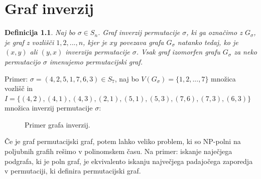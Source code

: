\documentclass[a4paper, 12pt]{book}
\newtheorem{definicija}{Definicija}[chapter]
\begin{document}
\chapter{ Graf inverzij }

\begin{definicija}
    Naj bo $\sigma \in S_n$. Graf inverzij permutacije $\sigma$, ki ga označimo z $G_{\sigma}$,  je graf z vozlišči $1, 2,..., n$, kjer je $xy$ povezava grafa $G_{\sigma}$ natanko tedaj, ko je $(x, y)$ ali $(y, x)$ inverzija permutacije $\sigma$. Vsak graf izomorfen grafu $G_{\sigma}$ za neko permutacijo $\sigma$ imenujemo permutacijski graf.
\end{definicija}

Primer: 
$\sigma = (4, 2, 5, 1, 7, 6, 3) \in S_7$, naj bo $V(G_{\sigma}) = \{ 1, 2, ..., 7\}$ množica vozlišč in $I = \{ (4, 2), (4, 1), (4, 3), (2, 1), (5, 1), (5, 3), (7, 6), (7, 3), (6, 3) \}$ množica inverzij permutacije $\sigma$:

\begin{figure}[h]
    \begin{center}        
    \end{center}
    \caption{Primer grafa inverzij.}
    \label{graf_inverzij}
\end{figure}

Če je graf permutacijski graf, potem lahko veliko problem, ki so NP-polni na poljubnih grafih rešimo v polinomskem času. Na primer: iskanje naječjega podgrafa, ki je poln graf, je ekvivalento iskanju največjega padajočega zaporedja v permutaciji, ki definira permutacijski graf.
\end{document}
